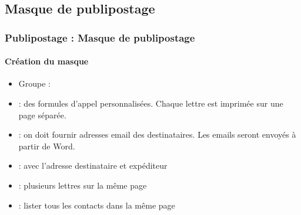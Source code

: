 \documentclass[xcolor=table]{beamer}
\begin{document}
\subsection{Masque de publipostage}

\begin{frame}
\frametitle{Publipostage : Masque de publipostage}
\framesubtitle{Création du masque}

\begin{minipage}{0.74\textwidth}
	\begin{itemize}
		\item Groupe : 
	\end{itemize}
\end{minipage}
\begin{minipage}{0.25\textwidth}
\end{minipage}

\begin{itemize}
	\item {} : des formules d'appel personnalisées. Chaque lettre est imprimée sur une page séparée. 
	\item {} : on doit fournir adresses email des destinataires. Les emails seront envoyés à partir de Word.
	\item {} : avec l'adresse destinataire et expéditeur
	\item {} : plusieurs lettres sur la même page
	\item {} : lister tous les contacts dans la même page
\end{itemize}

\end{frame}
\end{document}
